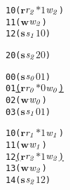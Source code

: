 \newsavebox{\boxnoone}
\begin{lrbox}{\boxnoone}
\begin{minipage}[t]{0.65\linewidth}
\large
\begin{alltt}
10 (\(\mathbf{r}\) \(\mathit{r\sb{2}}\) \(\mathit{\ast 1}\) \(\mathit{w\sb{2}}\)) 
11 (\(\mathbf{w}\) \(\mathit{w\sb{2}}\))
12 (\(\mathbf{s}\) \(\mathit{s\sb{1}}\) \(\mathit{1 0}\))
\end{alltt}
\end{minipage}
\end{lrbox}

\newsavebox{\boxnotwo}
\begin{lrbox}{\boxnotwo}
\begin{minipage}[t]{0.65\linewidth}
\large
\begin{alltt}
20 (\(\mathbf{s}\) \(\mathit{s\sb{2}}\) \(\mathit{2 0}\))
\end{alltt}
\end{minipage}
\end{lrbox}


\newcommand\examplefigtwo{
\begin{figure*}[tb]
\begin{center}
\setlength{\tabcolsep}{2pt}
\begin{tabular}[t]{c|c|c}
$\mathit{p_0}$ & $\mathit{p_1}$ & $\mathit{p_2}$ \\
\hline
\scalebox{0.8}{\usebox{\boxnozero}}&
\scalebox{0.8}{\usebox{\boxnoone}} &
\scalebox{0.8}{\usebox{\boxnotwo}}\\
\end{tabular}
\end{center}
\caption{No deadlock caused by orphaned receive.}
\label{fig:nodeadlock1}
\end{figure*}
}


\newsavebox{\boxone}
\begin{lrbox}{\boxone}
\begin{minipage}[t]{0.65\linewidth}
\large
\begin{alltt}
00 (\(\mathbf{s}\) \(\mathit{s\sb{0}}\) \(\mathit{0 1}\)) 
01 \underline{(\(\mathbf{r}\) \(\mathit{r\sb{0}}\) \(\mathit{\ast 0}\) \(\mathit{w\sb{0}}\))}
02 (\(\mathbf{w}\) \(\mathit{w\sb{0}}\)) 
03 (\(\mathbf{s}\) \(\mathit{s\sb{1}}\) \(\mathit{0 1}\))
\end{alltt}
\end{minipage}
\end{lrbox}

\newsavebox{\boxtwo}
\begin{lrbox}{\boxtwo}
\begin{minipage}[t]{0.65\linewidth}
\large
\begin{alltt}
10 (\(\mathbf{r}\) \(\mathit{r\sb{1}}\) \(\mathit{\ast 1}\) \(\mathit{w\sb{1}}\)) 
11 (\(\mathbf{w}\) \(\mathit{w\sb{1}}\))
12 \underline{(\(\mathbf{r}\) \(\mathit{r\sb{2}}\) \(\mathit{\ast 1}\) \(\mathit{w\sb{2}}\))}
13 (\(\mathbf{w}\) \(\mathit{w\sb{2}}\)) 
14 (\(\mathbf{s}\) \(\mathit{s\sb{2}}\) \(\mathit{1 2}\))
\end{alltt}
\end{minipage}
\end{lrbox}

